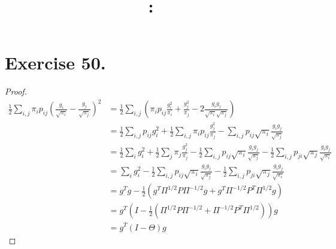 \documentclass{article}
\date{}
\title{
    \textmd{\textbf{\hmwkClass:\ \hmwkTitle}}\\
}
\author{\hmwkAuthorName}
\begin{document}
\maketitle

\section{Exercise 50.}
\begin{proof}
\begin{align*}
\frac{1}{2}\sum_{i,j} \pi_i p_{ij}(\frac{g_i}{\sqrt{\pi_i}}-\frac{g_j}{\sqrt{\pi_j}})^2
&= \frac{1}{2}\sum_{i,j}( \pi_i p_{ij}\frac{g_i^2}{\pi_i}+\frac{g_j^2}{\pi_j} - 2\frac{g_ig_j}{\sqrt{\pi_i}\sqrt{\pi_j}})\\
&= \frac{1}{2}\sum_{i,j}p_{ij}g_i^2+\frac{1}{2}\sum_{i,j}\pi_i p_{ij}\frac{g_j^2}{\pi_j} - \sum_{i,j}p_{ij}\sqrt{\pi_i}\frac{g_ig_j}{\sqrt{\pi_j}}\\
&= \frac{1}{2}\sum_{i}g_i^2+\frac{1}{2}\sum_{j}\pi_j \frac{g_j^2}{\pi_j}  - \frac{1}{2}\sum_{i,j}p_{ij}\sqrt{\pi_i}\frac{g_ig_j}{\sqrt{\pi_j}} - \frac{1}{2}\sum_{i,j}p_{ji}\sqrt{\pi_j}\frac{g_ig_j}{\sqrt{\pi_i}} \\
&= \sum_{i}g_i^2 - \frac{1}{2}\sum_{i,j}p_{ij}\sqrt{\pi_i}\frac{g_ig_j}{\sqrt{\pi_j}} - \frac{1}{2}\sum_{i,j}p_{ji}\sqrt{\pi_j}\frac{g_ig_j}{\sqrt{\pi_i}} \\
& = g^{T}g- \frac{1}{2}(g^T\Pi^{1/2}P\Pi^{-1/2}g + g^T\Pi^{-1/2}P^{T}\Pi^{1/2}g)\\
&= g^{T}(I - \frac{1}{2}(\Pi^{1/2}P\Pi^{-1/2} + \Pi^{-1/2}P^{T}\Pi^{1/2}))g \\
& = g^{T}(I - \Theta)g
\end{align*}
\end{proof}
\end{document}
